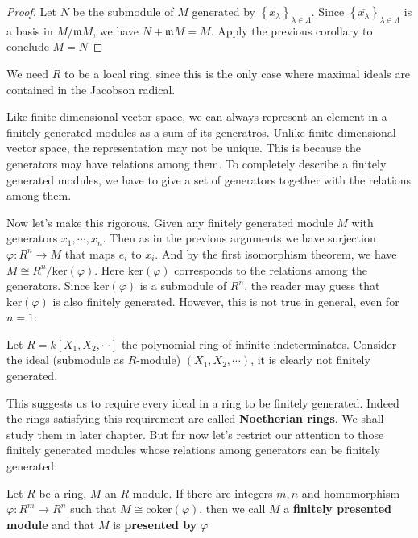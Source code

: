 \documentclass{note-eng}
\begin{document}
\begin{proof}
    Let $N$ be the submodule of $M$ generated by $\left\lbrace x_{\lambda} \right\rbrace_{\lambda \in \Lambda}$. Since $\left\lbrace \overline{x_{\lambda}} \right\rbrace_{\lambda \in \Lambda}$ is a basis in $M / \mathfrak{m} M$, we have $N + \mathfrak{m}M = M$. Apply the previous corollary to conclude $M = N$
\end{proof}

\begin{remark}
    We need $R$ to be a local ring, since this is the only case where maximal ideals are contained in the Jacobson radical.
\end{remark}

\fi

Like finite dimensional vector space, we can always represent an element in a finitely generated modules as a sum of its generatros. Unlike finite dimensional vector space, the representation may not be unique. This is because the generators may have relations among them. To completely describe a finitely generated modules, we have to give a set of generators together with the relations among them.

Now let's make this rigorous. Given any finitely generated module $M$ with generators $x_1, \cdots, x_n$. Then as in the previous arguments we have surjection $\varphi: R^n \rightarrow M$ that maps $e_i$ to $x_i$. And by the first isomorphism theorem, we have $M \cong R^n / \mathrm{ker}(\varphi)$. Here $\mathrm{ker}(\varphi)$ corresponds to the relations among the generators. Since $\mathrm{ker}(\varphi)$ is a submodule of $R^n$, the reader may guess that $\mathrm{ker}(\varphi)$ is also finitely generated. However, this is not true in general, even for $n = 1$:

\begin{example}
    Let $R = k[X_1, X_2, \cdots]$ the polynomial ring of infinite indeterminates. Consider the ideal (submodule as $R$-module) $(X_1, X_2, \cdots)$, it is clearly not finitely generated.
\end{example}

This suggests us to require every ideal in a ring to be finitely generated. Indeed the rings satisfying this requirement are called \textbf{Noetherian rings}. We shall study them in later chapter. But for now let's restrict our attention to those finitely generated modules whose relations among generators can be finitely generated:

\begin{definition}
    Let $R$ be a ring, $M$ an $R$-module. If there are integers $m, n$ and homomorphism $\varphi: R^m \rightarrow R^n$ such that $M \cong \mathrm{coker}(\varphi)$, then we call $M$ a \textbf{finitely presented module} and that $M$ is \textbf{presented by} $\varphi$
\end{definition}
\end{document}
